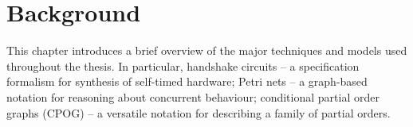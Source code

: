 \chapter{Background}

\label{chap:Background}
This chapter introduces a brief overview of the major techniques and models used throughout the thesis. In particular, handshake circuits -- a specification formalism for synthesis of self-timed hardware; Petri nets -- a graph-based notation for reasoning about concurrent behaviour; conditional partial order graphs (CPOG) -- a versatile notation for describing a family of partial orders.




